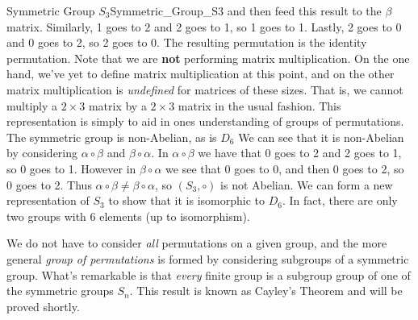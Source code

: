 \begin{lexample}{Symmetric Group $S_{3}$}{Symmetric_Group_S3}
        and then feed this result to the $\beta$ matrix. Similarly,
        1 goes to 2 and 2 goes to 1, so 1 goes to 1. Lastly, 2 goes to 0 and 0
        goes to 2, so 2 goes to 0. The resulting permutation is the identity
        permutation. Note that we are \textbf{not} performing matrix
        multiplication. On the one hand, we've yet to define matrix
        multiplication at this point, and on the other matrix multiplication is
        \textit{undefined} for matrices of these sizes. That is, we cannot
        multiply a $2\times{3}$ matrix by a $2\times{3}$ matrix in the usual
        fashion. This representation is simply to aid in ones understanding of
        groups of permutations. The symmetric group is non-Abelian, as is
        $D_{6}$ We can see that it is non-Abelian by considering
        $\alpha\circ\beta$ and $\beta\circ\alpha$. In $\alpha\circ\beta$ we have
        that 0 goes to 2 and 2 goes to 1, so 0 goes to 1. However in
        $\beta\circ\alpha$ we see that 0 goes to 0, and then 0 goes to 2, so 0
        goes to 2. Thus $\alpha\circ\beta\ne\beta\circ\alpha$, so
        $(S_{3},\circ)$ is not Abelian. We can form a new representation of
        $S_{3}$ to show that it is isomorphic to $D_{6}$. In fact, there are
        only two groups with 6 elements (up to isomorphism).
    \end{lexample}
    We do not have to consider \textit{all} permutations on a given group, and
    the more general \textit{group of permutations} is formed by considering
    subgroups of a symmetric group. What's remarkable is that \textit{every}
    finite group is a subgroup group of one of the symmetric groups $S_{n}$.
    This result is known as Cayley's Theorem and will be
    proved shortly.
